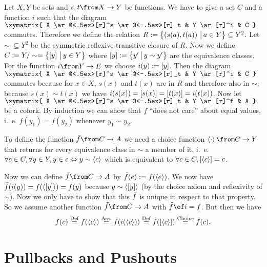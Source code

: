 \begin{example}
  Let $X, Y$ be sets and $s, t \from X \to Y$ be functions.
  We have to give a set $C$ and a function $i$ such that the diagram
  $ \xymatrix{
    X \ar@<.5ex>[r]^s \ar@<-.5ex>[r]_t & Y \ar[r]^i & C
  } $
  commutes.
  Therefore we define the relation
  $R := \bigl \{ \left( s(a) , t(a) \right) \,\big|\, a \in Y \bigr \} \subseteq Y^2$.
  Let $\sim \; \subseteq Y^2$ be the symmetric reflexive transitive closure of $R$.
  Now we define $C := Y / \sim = \bigl \{ \left[ y \right] \,\big|\, y \in Y \bigr \}$ where $\left[ y \right] := \bigl \{ y' \,\big|\, y \sim y' \bigr \}$ are the equivalence classes.
  For the function $i \from Y \to E$ we choose $i(y) := \left[ y \right]$.
  Then the diagram
  $ \xymatrix{
    X \ar@<.5ex>[r]^s \ar@<-.5ex>[r]_t & Y \ar[r]^i & C
  } $
  commutes because for $x \in X$, $s(x)$ and $t(x)$ are in $R$ and therefore also in $\sim$; because $s(x) \sim t(x)$ we have $i(s(x)) = \left[ s(x) \right] = \left[ t(x) \right] = i(t(x))$.
  Now let
  $ \xymatrix{
    X \ar@<.5ex>[r]^s \ar@<-.5ex>[r]_t & Y \ar[r]^f & A
  } $
  be a cofork.
  By induction we can show that $f$ ``does not care'' about equal values, i.~e. $f(y_1) = f(y_2)$ whenever $y_1 \sim y_2$.

  To define the function $\fbar \from C \to A$ we need a choice function $\choice \cdot \from C \to Y$ that returns for every equivalence class in $\sim$ a member of it, i.~e.
  $\forall c \in C, \forall y \in Y, y \in c \Leftrightarrow y \sim \left< c \right>$
  which is equivalent to $\forall c \in C, \left[ \left< c \right> \right] = c$.

  Now we can define $\fbar \from C \to A$ by $\bar{f}(e) := f(\left< e \right>)$.
  We now have  $\bar{f}(i(y)) = f(\left< \left[ y \right] \right>) = f(y)$ because $y \sim \left< \left[ y \right] \right>$ (by the choice axiom and reflexivity of $\sim$).
  Now we only have to show that this $\bar{f}$ is unique in respect to that property.
  So we assume another function $\ftilde \from C \to A$ with $\ftilde \of i = f$. But then we have
  $$ \bar{f}(c) \stackrel{\text{Def}}{=} f(\left< c \right>) \stackrel{\text{Ass.}}{=} \tilde{f}(i(\left< c \right>)) \stackrel{\text{Def}}{=} \tilde{f}(\left[ \left< c \right> \right]) \stackrel{\text{Choice}}{=} \tilde{f}(c).$$
\end{example}


\section*{Pullbacks and Pushouts}

